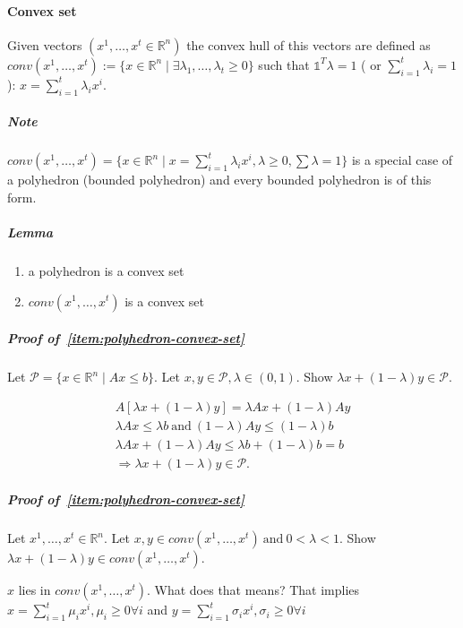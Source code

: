 \documentclass[main]{subfiles}
\begin{document}
\paragraph{Convex set}
Given vectors $(x^{1}, \dots, x^{t} \in \mathbb{R}^{n})$ the convex hull of
this vectors are defined as $conv(x^{1}, \dots, x^{t}):= \{ x \in
\mathbb{R}^{n} \mid \exists \lambda_{1}, \dots, \lambda_{t} \geq 0 \}$ such
that $\mathds{1}^{T} \lambda = 1$ ( or $\sum_{i=1}^{t} \lambda_{i} = 1$):
$x = \sum_{i=1}^{t} \lambda_{i} x^{i}$.

\subparagraph{Note}
$conv(x^{1}, \dots, x^{t}) = \{ x \in \mathbb{R}^{n} \mid x = \sum_{i=1}^{t}
\lambda_{i} x^{i}, \lambda \geq 0, \sum \lambda = 1 \}$ is a special case of a
polyhedron (bounded polyhedron) and every bounded polyhedron is of this form.

\subparagraph{Lemma}
\begin{enumerate}
\item \label{item:polyhedron-convex-set} a polyhedron is a convex set
\item \label{item:convex-hull-convex-set} $conv(x^{1}, \dots, x^{t})$ is a convex set
\end{enumerate}

\subparagraph{Proof of~\ref{item:polyhedron-convex-set}}
Let $\mathcal{P} = \{ x \in \mathbb{R}^{n} \mid Ax \leq b\}$. Let $x,y \in
\mathcal{P}, \lambda \in (0,1)$. Show $\lambda x + (1 - \lambda) y \in
\mathcal{P}$.

\begin{gather*}
A [\lambda x + (1-\lambda)y ] = \lambda Ax + (1-\lambda)Ay \\
 \lambda Ax \leq \lambda b \  \text{and}\  (1-\lambda)Ay \leq (1-\lambda) b \\
 \lambda Ax + (1-\lambda)Ay \leq \lambda b + (1-\lambda) b = b \\
 \Rightarrow \lambda x + (1-\lambda)y \in \mathcal{P}.
\end{gather*}

\subparagraph{Proof of~\ref{item:polyhedron-convex-set}}
Let $x^{1}, \dots, x^{t} \in \mathbb{R}^{n}$. Let $x,y \in conv(x^{1}, \dots,
x^{t})\ \text{and} \ 0 < \lambda < 1$. Show $\lambda x + (1-\lambda)y \in
conv(x^{1}, \dots, x^{t})$.

$x$ lies in $conv(x^{1}, \dots, x^{t})$. What does that means? That implies
$x = \sum_{i=1}^{t} \mu_{i} x^{i}, \mu_{i} \geq 0 \forall i$ and 
$y = \sum_{i=1}^{t} \sigma_{i} x^{i}, \sigma_{i} \geq 0 \forall i$
\end{document}
